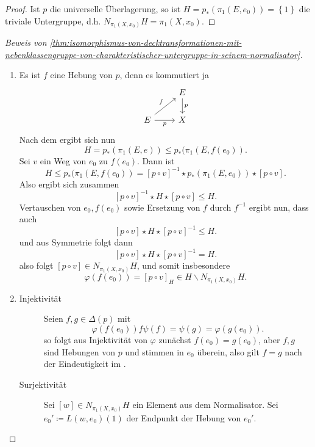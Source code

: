 \begin{proof}
    Ist $p$ die universelle Überlagerung, so ist  $H = p_*(\pi_1(E,e_0)) = \left \{1\right\} $ die triviale Untergruppe, d.h. $N_{\pi_1(X,x_0)}H = \pi_1(X,x_0)$.
\end{proof}

\begin{proof}[Beweis von \autoref{thm:isomorphismus-von-decktransformationen-mit-nebenklassengruppe-von-charakteristischer-untergruppe-in-seinem-normalisator}]
    \begin{enumerate}[1)]
        \item Es ist $f$ eine Hebung von  $p$, denn es kommutiert ja
            \[
             \begin{tikzcd}
                & E \ar{d}{p} \\
                 E \ar{ur}{f} \ar[swap]{r}{p} & X
            \end{tikzcd}
        \]
    Nach dem  ergibt sich nun
    \[
        H = p_*(\pi_1(E,e)) \leq  p_*(\pi_1(E,f(e_0))
    .\] 
    Sei $v$ ein Weg von  $e_0$ zu $f(e_0)$. Dann ist
    \[
        H\leq p_*(\pi_1(E,f(e_0)) = [p \circ  v] ^{-1} \star p_*(\pi_1(E,e_0)) \star [p \circ  v]
    .\]
    Also ergibt sich zusammen
    \[
        [p \circ  v] ^{-1} \star H \star [p \circ  v] \leq H
    .\] 
    Vertauschen von $e_0,f(e_0)$ sowie Ersetzung von $f$ durch  $f^{-1}$ ergibt nun, dass auch
    \[
        [p \circ  v] \star H \star [p \circ v] ^{-1} \leq H
    .\] 
    und aus Symmetrie folgt dann
    \[
        [p \circ  v] \star H \star [p \circ  v] ^{-1} = H
    .\] 
    also folgt $[p \circ v] \in N_{\pi_1(X,x_0)} H$, und somit insbesondere
    \[
        \varphi (f(e_0)) = [p \circ  v]_H \in H \backslash N_{\pi_1(X,x_0)} H
    .\] 
\item
    \begin{description}
        \item[Injektivität] Seien $f,g \in \Delta(p)$ mit
            \[
                \varphi (f(e_0)) f \psi (f) = \psi (g) = \varphi (g(e_0))
            .\] 
            so folgt aus Injektivität von $\varphi $ zunächst $f(e_0) = g(e_0)$, aber $f,g$ sind Hebungen von  $p$ und stimmen in  $e_0$ überein, also gilt $f=g$ nach der Eindeutigkeit im  .
        \item[Surjektivität] Sei $[w] \in N_{\pi_1(X,x_0)}H$ ein Element aus dem Normalisator. Sei $e_0' \coloneqq  L(w,e_0)(1)$ der Endpunkt der Hebung von $e_0'$.


\end{description}
\end{enumerate}
\end{proof}
